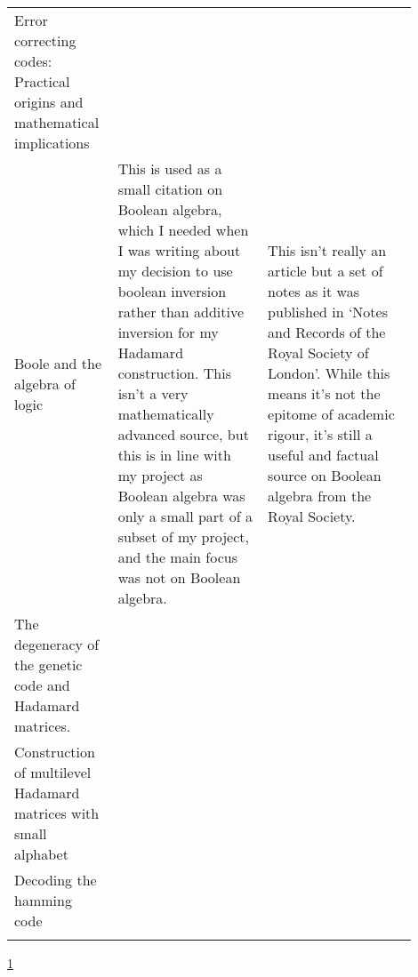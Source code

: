 \documentclass{article}
\begin{document}
\begin{center}
{\begin{longtable}{p{0.2\linewidth} p{0.35\linewidth} p{0.35\linewidth}}
    Error correcting codes: Practical origins and mathematical implications \citep*{CodesOrigins1978Pless} &

    \\

    Boole and the algebra of logic \citep*{BooleRecords1956Kneale} &

    This is used as a small citation on Boolean algebra, which I needed when I
    was writing about my decision to use boolean inversion rather than additive
    inversion for my Hadamard construction. This isn't a very mathematically
    advanced source, but this is in line with my project as Boolean algebra was
    only a small part of a subset of my project, and the main focus was not on
    Boolean algebra. &

    This isn't really an article but a set of notes as it was published in
    `Notes and Records of the Royal Society of London'. While this means it's
    not the epitome of academic rigour, it's still a useful and factual source
    on Boolean algebra from the Royal Society.

    \\

    The degeneracy of the genetic code and Hadamard matrices. \citep*{DegeneracyHadamard2008Petoukhov}

    \\

    Construction of multilevel Hadamard matrices with small alphabet \citep*{MultilevelConstruction2008TrinhFan}

    \\

    Decoding the hamming code \citep*{DecodingHamming2006Eherenborg}

    \\

    \bottomrule
    \label{tab:sourceeval}
    \end{longtable}
    }

    \ref{tab:sourceeval}
    \end{center}

    
    
\end{document}
